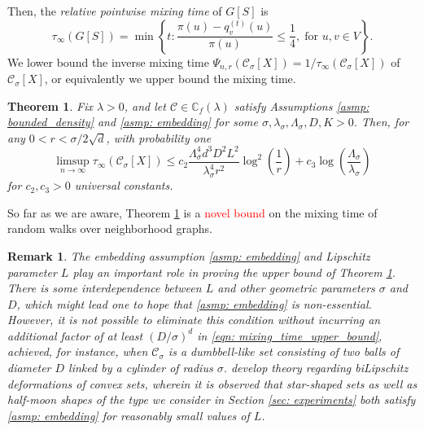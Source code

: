 \documentclass{article}
\newcommand{\set}[1]{\left\{#1\right\}}
\newcommand{\1}{\mathbf{1}}
\newcommand{\Xbf}{X}             %
\newcommand{\Cbb}{\mathbb{C}}
\newcommand{\Cset}{\mathcal{C}}
\newcommand{\Csig}{\Cset_{\sigma}}
\theoremstyle{aldenthm}
\newtheorem{theorem}{Theorem}
\theoremstyle{aldenrmrk}
\newtheorem{remark}{Remark}
\begin{document}
Then, the \emph{relative pointwise mixing time} of $G[S]$ is 
\begin{equation}
\label{eqn: mixing_time}
\tau_{\infty}(G[S]) = \min\set{ t: \frac{\pi(u) - q_{v}^{(t)}(u)
	}{\pi(u)} \leq \frac{1}{4}, 
	\; \text{for $u,v \in V$}}. 
\end{equation}
We lower bound the inverse mixing time $\Psi_{n,r}(\Csig[\Xbf]) = 1/\tau_{\infty}(\Csig[\Xbf])$ of $\Csig[\Xbf]$, or equivalently we upper bound the mixing time.

\begin{theorem}
	\label{thm: mixing_time_upper_bound}
	Fix $\lambda > 0$, and let $\Cset \in \Cbb_f(\lambda)$ satisfy Assumptions \ref{asmp: bounded_density} and \ref{asmp: embedding} for some $\sigma, \lambda_{\sigma}, \Lambda_{\sigma}, D, K > 0$. Then, for any $0 < r < \sigma/2\sqrt{d}$, with probability one
	\begin{equation}
	\label{eqn: mixing_time_upper_bound}
	\limsup_{n \to \infty}\tau_{\infty}(\Csig[\Xbf]) \leq c_2 \frac{\Lambda_{\sigma}^4 d^3 D^2 L^2}{\lambda_{\sigma}^4 r^2} \log^2\left(\frac{1}{r}\right) + c_3 \log\left(\frac{\Lambda_{\sigma}}{\lambda_{\sigma}}\right)
	\end{equation}
	for $c_2,c_3 > 0$ universal constants. 
\end{theorem}

So far as we are aware, Theorem \ref{thm: mixing_time_upper_bound} is a \textcolor{red}{novel bound} on the mixing time of random walks over neighborhood graphs. 
\begin{remark}
	The embedding assumption \ref{asmp: embedding} and Lipschitz parameter $L$ play an important role in proving the upper bound of Theorem \ref{thm: mixing_time_upper_bound}. There is some interdependence between $L$ and other geometric parameters $\sigma$ and $D$, which might lead one to hope that \ref{asmp: embedding} is non-essential. However, it is not possible to eliminate this condition without incurring an additional factor of at least $(D/\sigma)^d$ in \eqref{eqn: mixing_time_upper_bound}, achieved, for instance, when $\Csig$ is a dumbbell-like set consisting of two balls of diameter $D$ linked by a cylinder of radius $\sigma$.  \citep{abbasi-yadkori2016, abbasi-yadkori2016a} develop theory regarding biLipschitz deformations of convex sets, wherein it is observed that star-shaped sets as well as half-moon shapes of the type we consider in Section \ref{sec: experiments} both satisfy \ref{asmp: embedding} for reasonably small values of $L$.
\end{remark}
\end{document}
